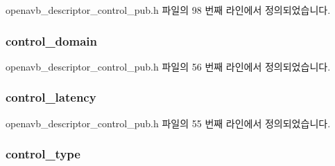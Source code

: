 openavb\+\_\+descriptor\+\_\+control\+\_\+pub.\+h 파일의 98 번째 라인에서 정의되었습니다.

\subsubsection[{\texorpdfstring{control\+\_\+domain}{control_domain}}]{ control\+\_\+domain}\hypertarget{structopenavb__aem__descriptor__control__t_a0cbc0c2de32138908232359750e2e863}{}\label{structopenavb__aem__descriptor__control__t_a0cbc0c2de32138908232359750e2e863}


openavb\+\_\+descriptor\+\_\+control\+\_\+pub.\+h 파일의 56 번째 라인에서 정의되었습니다.

\subsubsection[{\texorpdfstring{control\+\_\+latency}{control_latency}}]{ control\+\_\+latency}\hypertarget{structopenavb__aem__descriptor__control__t_abef1766e6d00e7e0f5136b820b271bb6}{}\label{structopenavb__aem__descriptor__control__t_abef1766e6d00e7e0f5136b820b271bb6}


openavb\+\_\+descriptor\+\_\+control\+\_\+pub.\+h 파일의 55 번째 라인에서 정의되었습니다.

\subsubsection[{\texorpdfstring{control\+\_\+type}{control_type}}]{ control\+\_\+type}\hypertarget{structopenavb__aem__descriptor__control__t_af50246c5cfea864b4f3560ae16791102}{}\label{structopenavb__aem__descriptor__control__t_af50246c5cfea864b4f3560ae16791102}


